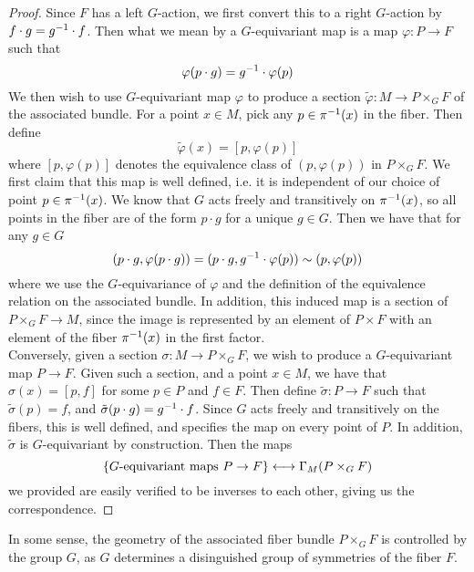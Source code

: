 \begin{proof}
Since $F$ has a left $G$-action, we first convert this to a right $G$-action
by $f \cdot g = g^{-1} \cdot f$. Then what we mean by a $G$-equivariant map is
a map $\varphi : P \to F$ such that
\[
\varphi(p\cdot g) = g^{-1}\cdot \varphi(p)
\]
We then wish to use $G$-equivariant map $\varphi$ to produce a section
$\tilde{\varphi} : M \to P \times_G F$ of the associated bundle. For a
point $x \in M$, pick any $p \in \pi^{-1}(x)$ in the fiber. Then define
\[
\tilde{\varphi}(x) = [p, \varphi(p)]
\]
where $[p, \varphi(p)]$ denotes the equivalence class of $(p, \varphi(p))$ in
$P \times_G F$. We first claim that this map is well defined, i.e. it is
independent of our choice of point $p \in \pi^{-1}(x)$. We know that $G$ acts
freely and transitively on $\pi^{-1}(x)$, so all points in the fiber are of
the form $p \cdot g$ for a unique $g \in G$. Then we have that for any $g \in G$
\[
(p\cdot g, \varphi(p \cdot g)) = (p \cdot g, g^{-1} \cdot \varphi(p)) \sim (p, \varphi(p))
\]
where we use the $G$-equivariance of $\varphi$ and the definition of the equivalence
relation on the associated bundle. In addition, this induced map is
a section of $P \times_G F \to M$, since the image is represented by an
element of $P \times F$ with an element of the fiber $\pi^{-1}(x)$ in the first
factor. \\

Conversely, given a section $\sigma : M \to P \times_G F$, we wish to produce
a $G$-equivariant map $P \to F$. Given such a section, and a point $x \in M$,
we have that $\sigma(x) = [p, f]$ for some $p \in P$ and $f \in F$. Then
define $\tilde{\sigma} : P \to F$ such that $\tilde{\sigma}(p) = f$, and
$\tilde{\sigma}(p \cdot g) = g^{-1} \cdot f$. Since $G$ acts freely and transitively
on the fibers, this is well defined, and specifies the map on every
point of $P$. In addition, $\tilde{\sigma}$ is $G$-equivariant by construction.
Then the maps
\[
\left\lbrace G\text{-equivariant maps } P \to F \right\rbrace \longleftrightarrow \Gamma_M(P \times_G F)
\]
we provided are easily verified to be inverses to each other, giving us the
correspondence.
\end{proof}
%
In some sense, the geometry of the associated fiber bundle $P \times_G F$
is controlled by the group $G$, as $G$ determines a disinguished
group of symmetries of the fiber $F$.
%
